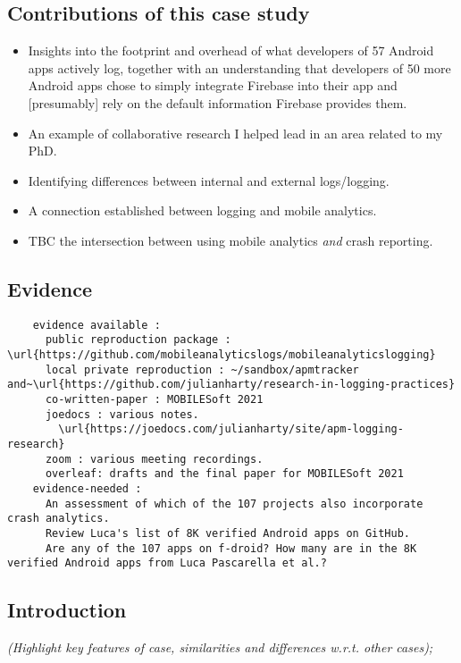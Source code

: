 \subsection*{Contributions of this case study}
\begin{itemize}
    \item Insights into the footprint and overhead of what developers of 57 Android apps actively log, together with an understanding that developers of 50 more Android apps chose to simply integrate Firebase into their app and [presumably] rely on the default information Firebase provides them.
    \item An example of collaborative research I helped lead in an area related to my PhD.
    \item Identifying differences between internal and external logs/logging.
    \item A connection established between logging and mobile analytics.
    \item TBC the intersection between using mobile analytics \textit{and} crash reporting.
\end{itemize}



\subsection*{Evidence}
  \begin{verbatim}
    evidence available :
      public reproduction package : \url{https://github.com/mobileanalyticslogs/mobileanalyticslogging}
      local private reproduction : ~/sandbox/apmtracker and~\url{https://github.com/julianharty/research-in-logging-practices}
      co-written-paper : MOBILESoft 2021
      joedocs : various notes.
        \url{https://joedocs.com/julianharty/site/apm-logging-research}
      zoom : various meeting recordings.
      overleaf: drafts and the final paper for MOBILESoft 2021
    evidence-needed : 
      An assessment of which of the 107 projects also incorporate crash analytics.
      Review Luca's list of 8K verified Android apps on GitHub.
      Are any of the 107 apps on f-droid? How many are in the 8K verified Android apps from Luca Pascarella et al.?
  \end{verbatim}  



\subsection{Introduction}
\emph{(Highlight key features of case, similarities and differences w.r.t. other cases);}

